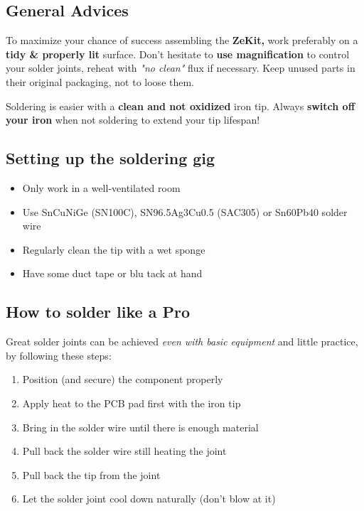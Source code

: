 \documentclass{scrartcl}
\begin{document}
\subsection{General Advices}

To maximize your chance of success assembling the \textbf{ZeKit,} work preferably on a \textbf{tidy \& properly lit} surface.
Don't hesitate to \textbf{use magnification} to control your solder joints, reheat with \emph{"no clean"} flux if necessary.
Keep unused parts in their original packaging, not to loose them.

Soldering is easier with a \textbf{clean and not oxidized} iron tip. Always \textbf{switch off your iron} when not soldering to extend your tip lifespan!

\subsection{Setting up the soldering gig}

\begin{itemize}
    \item Only work in a well-ventilated room
    \item Use SnCuNiGe (SN100C), SN96.5Ag3Cu0.5 (SAC305) or Sn60Pb40 solder wire
    \item Regularly clean the tip with a wet sponge
    \item Have some duct tape or blu tack at hand
\end{itemize}

\subsection{How to solder like a Pro}

Great solder joints can be achieved \emph{even with basic equipment} and little practice,\\
by following these steps:

\begin{enumerate}
    \item Position (and secure) the component properly
    \item Apply heat to the PCB pad first with the iron tip
    \item Bring in the solder wire until there is enough material
    \item Pull back the solder wire still heating the joint
    \item Pull back the tip from the joint
    \item Let the solder joint cool down naturally (don't blow at it)
\end{enumerate}
\end{document}

